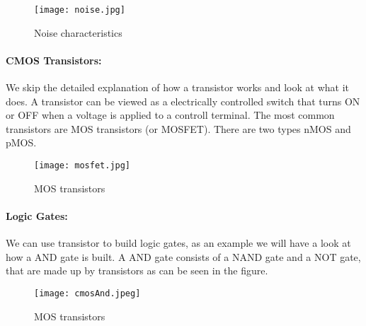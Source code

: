 \begin{figure}[h]
    \centering
    \texttt{[image: noise.jpg]}
    \caption{Noise characteristics}
\end{figure}

\paragraph{CMOS Transistors:} We skip the detailed explanation of how a transistor works and look at what it does.
A transistor can be viewed as a electrically controlled switch that turns ON or OFF when a voltage is applied to a
controll terminal. The most common transistors are MOS transistors (or MOSFET). There are two types nMOS and pMOS.
\pagebreak
\begin{figure}[h]
    \centering
    \texttt{[image: mosfet.jpg]}
    \caption{MOS transistors}
\end{figure}
\pagebreak

\paragraph{Logic Gates:} We can use transistor to build logic gates, as an example we will have a look at how a AND gate is
built. A AND gate consists of a NAND gate and a NOT gate, that are made up by transistors as can be seen in the figure.

\begin{figure}[h]
    \centering
    \texttt{[image: cmosAnd.jpeg]}
    \caption{MOS transistors}
\end{figure}
